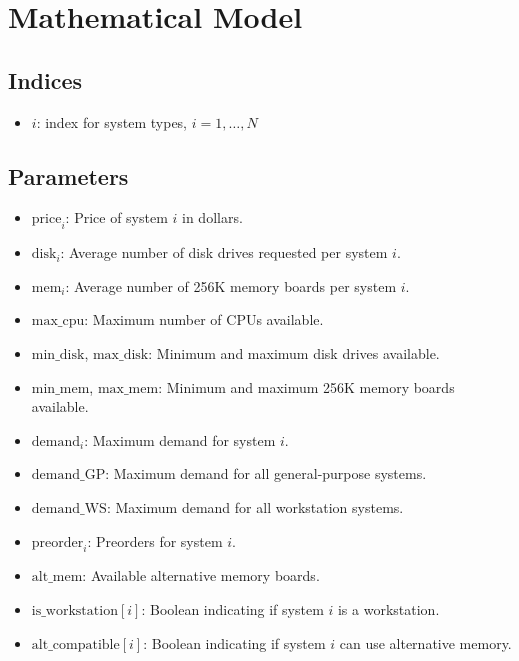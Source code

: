 \documentclass{article}
\begin{document}
\section*{Mathematical Model}

\subsection*{Indices}
\begin{itemize}
    \item \( i \): index for system types, \( i = 1, \ldots, N \)
\end{itemize}

\subsection*{Parameters}
\begin{itemize}
    \item \(\text{price}_i\): Price of system \( i \) in dollars.
    \item \(\text{disk}_i\): Average number of disk drives requested per system \( i \).
    \item \(\text{mem}_i\): Average number of 256K memory boards per system \( i \).
    \item \(\text{max\_cpu}\): Maximum number of CPUs available.
    \item \(\text{min\_disk}\), \(\text{max\_disk}\): Minimum and maximum disk drives available.
    \item \(\text{min\_mem}\), \(\text{max\_mem}\): Minimum and maximum 256K memory boards available.
    \item \(\text{demand}_i\): Maximum demand for system \( i \).
    \item \(\text{demand\_GP}\): Maximum demand for all general-purpose systems.
    \item \(\text{demand\_WS}\): Maximum demand for all workstation systems.
    \item \(\text{preorder}_i\): Preorders for system \( i \).
    \item \(\text{alt\_mem}\): Available alternative memory boards.
    \item \(\text{is\_workstation}[i]\): Boolean indicating if system \( i \) is a workstation.
    \item \(\text{alt\_compatible}[i]\): Boolean indicating if system \( i \) can use alternative memory.
\end{itemize}
\end{document}
